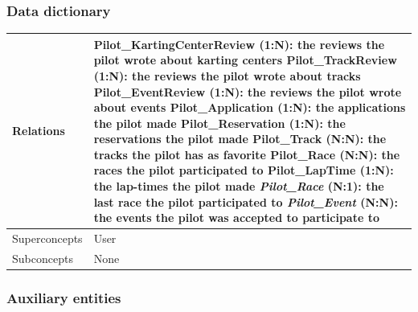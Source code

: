 \documentclass{beamer}
\begin{document}
\begin{frame}
    \frametitle{Data dictionary}
    \begin{table}
    \tiny
    \begin{tabular}{|p{2cm}|p{6cm}|}
    \hline
    Relations &
    Pilot\_KartingCenterReview (1:N): the reviews the pilot wrote about karting centers \newline
    Pilot\_TrackReview (1:N): the reviews the pilot wrote about tracks \newline
    Pilot\_EventReview (1:N): the reviews the pilot wrote about events \newline
    Pilot\_Application (1:N): the applications the pilot made \newline
    Pilot\_Reservation (1:N): the reservations the pilot made \newline
    Pilot\_Track (N:N): the tracks the pilot has as favorite \newline
    Pilot\_Race (N:N): the races the pilot participated to \newline
    Pilot\_LapTime (1:N): the lap-times the pilot made \newline
    \textit{Pilot\_Race} (N:1): the last race the pilot participated to \newline
    \textit{Pilot\_Event} (N:N): the events the pilot was accepted to participate to \\
    \hline
    Superconcepts & User \\
    \hline
    Subconcepts & None \\
    \hline
    \end{tabular}
    \end{table}
\end{frame}

\subsubsection{Auxiliary entities}
\end{document}
